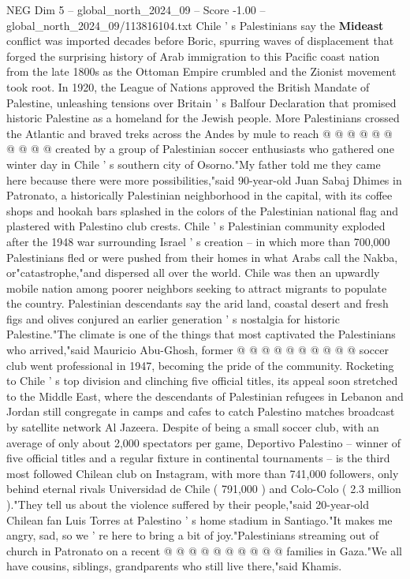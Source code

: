 \begin{textsample}{NEG Dim 5 – global\_north\_2024\_09 – Score -1.00 – global\_north\_2024\_09/113816104.txt}
Chile ' s Palestinians say the \textbf{Mideast} conflict was imported decades before Boric, spurring waves of displacement that forged the surprising history of Arab immigration to this Pacific coast nation from the late 1800s as the Ottoman Empire crumbled and the Zionist movement took root.
In 1920, the League of Nations approved the British Mandate of Palestine, unleashing tensions over Britain ' s Balfour Declaration that promised historic Palestine as a homeland for the Jewish people.
More Palestinians crossed the Atlantic and braved treks across the Andes by mule to reach @ @ @ @ @ @ @ @ @ @ created by a group of Palestinian soccer enthusiasts who gathered one winter day in Chile ' s southern city of Osorno."My father told me they came here because there were more possibilities,"said 90-year-old Juan Sabaj Dhimes in Patronato, a historically Palestinian neighborhood in the capital, with its coffee shops and hookah bars splashed in the colors of the Palestinian national flag and plastered with Palestino club crests.
Chile ' s Palestinian community exploded after the 1948 war surrounding Israel ' s creation -- in which more than 700,000 Palestinians fled or were pushed from their homes in what Arabs call the Nakba, or"catastrophe,"and dispersed all over the world.
Chile was then an upwardly mobile nation among poorer neighbors seeking to attract migrants to populate the country.
Palestinian descendants say the arid land, coastal desert and fresh figs and olives conjured an earlier generation ' s nostalgia for historic Palestine."The climate is one of the things that most captivated the Palestinians who arrived,"said Mauricio Abu-Ghosh, former @ @ @ @ @ @ @ @ @ @ soccer club went professional in 1947, becoming the pride of the community.
Rocketing to Chile ' s top division and clinching five official titles, its appeal soon stretched to the Middle East, where the descendants of Palestinian refugees in Lebanon and Jordan still congregate in camps and cafes to catch Palestino matches broadcast by satellite network Al Jazeera.
Despite of being a small soccer club, with an average of only about 2,000 spectators per game, Deportivo Palestino -- winner of five official titles and a regular fixture in continental tournaments -- is the third most followed Chilean club on Instagram, with more than 741,000 followers, only behind eternal rivals Universidad de Chile ( 791,000 ) and Colo-Colo ( 2.3 million )."They tell us about the violence suffered by their people,"said 20-year-old Chilean fan Luis Torres at Palestino ' s home stadium in Santiago."It makes me angry, sad, so we ' re here to bring a bit of joy."Palestinians streaming out of church in Patronato on a recent @ @ @ @ @ @ @ @ @ @ families in Gaza."We all have cousins, siblings, grandparents who still live there,"said Khamis.

\end{textsample}
